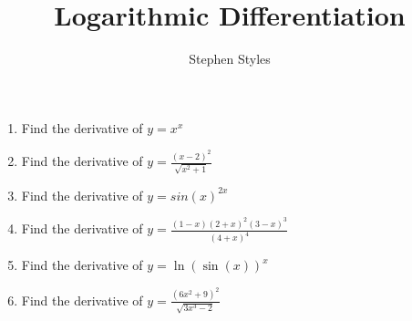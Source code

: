 \documentclass[12pt]{article}
\title{Logarithmic Differentiation}
\author{Stephen Styles}
\theoremstyle{remark}
\begin{document}
\maketitle

\begin{enumerate}


\item Find the derivative of $y = x^x$
\vspace{5cm}
\item Find the derivative of $\displaystyle{y = \frac{(x-2)^2}{\sqrt{x^2+1}}}$
\vspace{5cm}
\item Find the derivative of $y = sin(x)^{2x}$
\vspace{5cm}
\newpage
\item Find the derivative of $\displaystyle{y = \frac{(1-x)(2+x)^2(3-x)^3}{(4+x)^4}}$
\vspace{5cm}
\item Find the derivative of $\displaystyle{y = \ln(\sin(x))^x}$
\vspace{5cm}
\item Find the derivative of $\displaystyle{y = \frac{(6x^2+9)^2}{\sqrt{3x^3-2}}}$
\vspace{5cm}
\end{enumerate}
\end{document}
